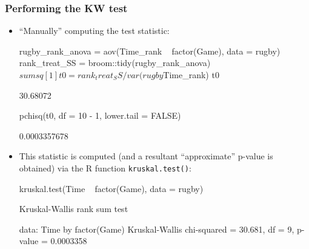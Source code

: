 \documentclass[a4paper]{article}\usepackage[]{graphicx}\usepackage[]{xcolor}
\begin{document}
\subsubsection{Performing the KW test}
\begin{itemize}
	\item ``Manually'' computing the test statistic:
\begin{Schunk}
\begin{Sinput}
rugby_rank_anova = aov(Time_rank ~ factor(Game), data = rugby)
rank_treat_SS = broom::tidy(rugby_rank_anova)$sumsq[1]
t0 = rank_treat_SS/var(rugby$Time_rank)
t0
\end{Sinput}
\begin{Soutput}
[1] 30.68072
\end{Soutput}
\begin{Sinput}
pchisq(t0, df = 10 - 1, lower.tail = FALSE)
\end{Sinput}
\begin{Soutput}
[1] 0.0003357678
\end{Soutput}
\end{Schunk}
	\item This statistic is computed (and a resultant ``approximate'' p-value is obtained) via the R function \lstinline|kruskal.test()|:
\begin{Schunk}
\begin{Sinput}
kruskal.test(Time ~ factor(Game), data = rugby)
\end{Sinput}
\begin{Soutput}

	Kruskal-Wallis rank sum test

data:  Time by factor(Game)
Kruskal-Wallis chi-squared = 30.681, df = 9, p-value = 0.0003358
\end{Soutput}
\end{Schunk}
\end{itemize}
\end{document}
